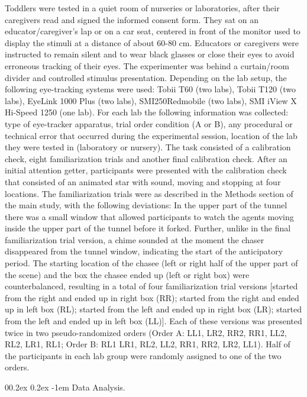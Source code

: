 \documentclass[
  man, donotrepeattitle,floatsintext]{apa6}
\makeatletter
\let\oldparagraph\paragraph
\renewcommand{\paragraph}{
    \@ifstar
      \xxxParagraphStar
      \xxxParagraphNoStar
  }
\newcommand{\xxxParagraphStar}[1]{\oldparagraph*{#1}\mbox{}}
\newcommand{\xxxParagraphNoStar}[1]{\oldparagraph{#1}\mbox{}}
\renewcommand{\paragraph}{\@startsection{paragraph}{4}{\parindent}%
  {0\baselineskip \@plus 0.2ex \@minus 0.2ex}%
  {-1em}%
  {\normalfont\normalsize\bfseries\itshape\typesectitle}}
\makeatother
\begin{document}
Toddlers were tested in a quiet room of nurseries or laboratories, after their caregivers read and signed the informed consent form. They sat on an educator/caregiver's lap or on a car seat, centered in front of the monitor used to display the stimuli at a distance of about 60-80 cm. Educators or caregivers were instructed to remain silent and to wear black glasses or close their eyes to avoid erroneous tracking of their eyes. The experimenter was behind a curtain/room divider and controlled stimulus presentation. Depending on the lab setup, the following eye-tracking systems were used: Tobii T60 (two labs), Tobii T120 (two labs), EyeLink 1000 Plus (two labs), SMI250Redmobile (two labs), SMI iView X Hi-Speed 1250 (one lab). For each lab the following information was collected: type of eye-tracker apparatus, trial order condition (A or B), any procedural or technical error that occurred during the experimental session, location of the lab they were tested in (laboratory or nursery).
The task consisted of a calibration check, eight familiarization trials and another final calibration check. After an initial attention getter, participants were presented with the calibration check that consisted of an animated star with sound, moving and stopping at four locations. The familiarization trials were as described in the Methods section of the main study, with the following deviations: In the upper part of the tunnel there was a small window that allowed participants to watch the agents moving inside the upper part of the tunnel before it forked. Further, unlike in the final familiarization trial version, a chime sounded at the moment the chaser disappeared from the tunnel window, indicating the start of the anticipatory period. The starting location of the chasee (left or right half of the upper part of the scene) and the box the chasee ended up (left or right box) were counterbalanced, resulting in a total of four familiarization trial versions {[}started from the right and ended up in right box (RR); started from the right and ended up in left box (RL); started from the left and ended up in right box (LR); started from the left and ended up in left box (LL){]}. Each of these versions was presented twice in two pseudo-randomized orders (Order A: LL1, LR2, RR2, RR1, LL2, RL2, LR1, RL1; Order B: RL1 LR1, RL2, LL2, RR1, RR2, LR2, LL1). Half of the participants in each lab group were randomly assigned to one of the two orders.

\paragraph{Data Analysis.}\label{data-analysis.}
\end{document}
